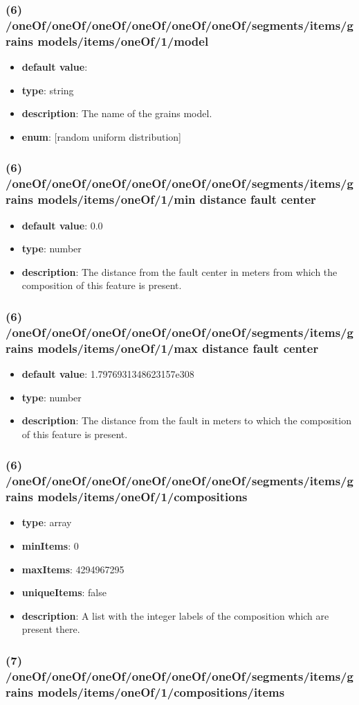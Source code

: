\subsubsection{(6) /oneOf/oneOf/oneOf/oneOf/oneOf/oneOf/segments/items/grains models/items/oneOf/1/model}
\begin{itemize}[leftmargin=6em]\item {\bf default value}: 
\item {\bf type}: string
\item {\bf description}: The name of the grains model.
\item {\bf enum}: [random uniform distribution]\end{itemize}\subsubsection{(6) /oneOf/oneOf/oneOf/oneOf/oneOf/oneOf/segments/items/grains models/items/oneOf/1/min distance fault center}
\begin{itemize}[leftmargin=6em]\item {\bf default value}: 0.0
\item {\bf type}: number
\item {\bf description}: The distance from the fault center in meters from which the composition of this feature is present.
\end{itemize}\subsubsection{(6) /oneOf/oneOf/oneOf/oneOf/oneOf/oneOf/segments/items/grains models/items/oneOf/1/max distance fault center}
\begin{itemize}[leftmargin=6em]\item {\bf default value}: 1.7976931348623157e308
\item {\bf type}: number
\item {\bf description}: The distance from the fault in meters to which the composition of this feature is present.
\end{itemize}\subsubsection{(6) /oneOf/oneOf/oneOf/oneOf/oneOf/oneOf/segments/items/grains models/items/oneOf/1/compositions}
\begin{itemize}[leftmargin=6em]\item {\bf type}: array
\item {\bf minItems}: 0
\item {\bf maxItems}: 4294967295
\item {\bf uniqueItems}: false
\item {\bf description}: A list with the integer labels of the composition which are present there.
\end{itemize}\subsubsection{(7) /oneOf/oneOf/oneOf/oneOf/oneOf/oneOf/segments/items/grains models/items/oneOf/1/compositions/items}
